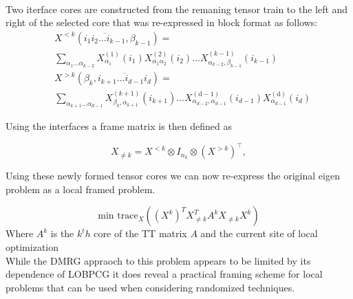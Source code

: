 \documentclass[%
 aip,12pt
 amsmath,amssymb,
 reprint,%
]{revtex4-1}
\begin{document}
\\
Two iterface cores are constructed from the remaning tensor train to the left and right of the selected core that was re-expressed in block format as follows:
\begin{equation}
\begin{split}
&X^{<k}\left(\overline{i_{1} i_{2} \ldots i_{k-1}}, \beta_{k-1}\right)=
\\
&\sum_{\alpha_{1} \ldots \alpha_{k-2}} X_{\alpha_{1}}^{(1)}\left(i_{1}\right) X_{\alpha_{1} \alpha_{2}}^{(2)}\left(i_{2}\right) \ldots X_{\alpha_{k-2}, \beta_{k-1}}^{(k-1)}\left(i_{k-1}\right) \\
&X^{>k}\left(\beta_{k}, \overline{i_{k+1} \ldots i_{d-1} i_{d}}\right)=
\\
&\sum_{\alpha_{k+1} \ldots \alpha_{d-1}} X_{\beta_{k}, \alpha_{k+1}}^{(k+1)}\left(i_{k+1}\right) \ldots X_{\alpha_{d-2}, \alpha_{d-1}}^{(\mathrm{d}-1)}\left(i_{d-1}\right) X_{\alpha_{d-1}}^{(\mathrm{d})}\left(i_{d}\right)
  \end{split}
  \end{equation}

Using the interfaces a frame matrix is then defined as

\begin{equation}
  X_{\neq k}=X^{<k} \otimes I_{n_{k}} \otimes\left(X^{>k}\right)^{\top},
\end{equation}

Using these newly formed tensor cores we can now re-express the original eigen problem as a local framed problem.

\begin{equation}
  \text{min trace}_X((X^k)^TX_{\neq k}^TA^kX_{\neq k}X^k)
\end{equation}
Where $A^k$ is the $k^th$ core of the TT matrix $A$ and the current site of local optimization\\

While the DMRG appraoch to this problem appears to be limited by its dependence of LOBPCG it does reveal a practical framing scheme for local problems that can be used when considering randomized techniques.
\end{document}
